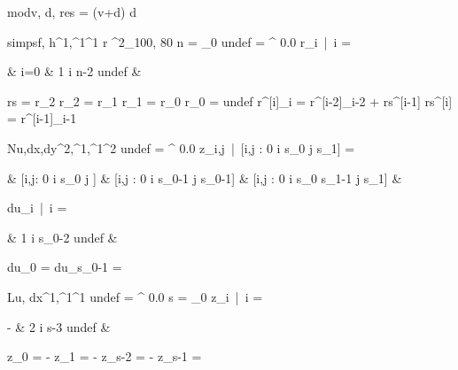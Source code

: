 \documentclass[12pt,a4paper]{book}
\begin{document}
\begin{eqcode}{mod}{v, d}{,}{}
 res = {(v+d) \mod d } \lend
\end{eqcode}

\begin{eqcode}{simps}{f, h}{^1,^1}{^1}
 r \in {}^2_{100, 80} \lend
 n = _0 \lend
 undef = \genar \limits^{} 0.0 \lend
 r_i\ |\ i \in [0,n-1] =
 \begin{cases}
   & i=0 \lend
   & 1 \leq i \leq n-2 \lend
  undef & \otherwise
 \end{cases}
 \lend
 rs = r_2 \lend
 r_2 = r_1 \lend
 r_1 = r_0 \lend
 r_0 = undef \lend
    r^{[i]}_i = r^{[i-2]}_{i-2} + rs^{[i-1]} \lend
 rs^{[i]} = r^{[i-1]}_{i-1} \lend
  \lend
\end{eqcode}

\begin{eqcode}{N}{u,dx,dy}{^2,^1,^1}{^2}
 undef = \genar \limits^{} 0.0 \lend
 z_{i,j}\ |\ [i,j : 0 \leq i \leq s_0  \leq j \leq s_1]
 =
 \begin{cases}
   & [i,j: 0 \leq i \leq s_0  \leq j ] \lend
   & [i,j : 0 \leq i \leq s_0-1  \leq j \leq s_0-1] \lend
   & [i,j : 0 \leq i \leq s_0 \land s_1-1 \leq j \leq s_1] 
   & \otherwise \end{cases} \lend
 du_i\ |\ i  =
 \begin{cases}
   & 1 \leq i \leq s_0-2 \lend
  undef & 
 \end{cases}
 \lend
 du_0 =  \lend
 du_{s_0-1} =  \lend
\end{eqcode}

\begin{eqcode}{L}{u, dx}{^1,^1}{^1}
 undef = \genar \limits^{} 0.0 \lend
 s = _0 \lend
 z_i\ |\ i  =
 \begin{cases}
  - 
   & 2 \leq i \leq s-3 \lend
  undef
   & \otherwise \lend
 \end{cases} \lend
 z_0 = - 
\lend
 z_1 = -  \lend
 z_{s-2} = -  \lend
 z_{s-1} =  \lend
\end{eqcode}
\end{document}
